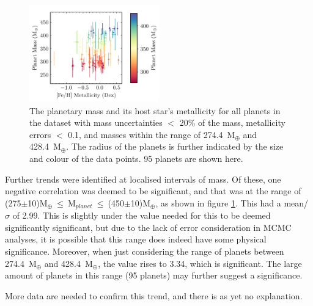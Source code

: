 \documentclass[a4paper,twocolumn,12pt]{article}
\begin{document}
\begin{figure}[h!]
    \centering
    \includegraphics[width=0.5\textwidth]{Graphs/FeH vs Mass Planet Plot 274.4 to 428.4.pdf}
    \caption{The planetary mass and its host star's metallicity for all planets in the dataset with mass uncertainties $<$ 20\% of the mass, metallicity errors $<$ 0.1, and masses within the range of 274.4~M$_{\oplus}$ and 428.4~M$_{\oplus}$. The radius of the planets is further indicated by the size and colour of the data points. 95 planets are shown here.}
    \label{figure: Fe/H vs Mass for the jupiter mass range}
\end{figure}

Further trends were identified at localised intervals of mass. Of these, one negative correlation was deemed to be significant, and that was at the range of (275$\pm$10)M$_{\oplus}~\leq~$M$_{planet}~\leq~$(450$\pm$10)M$_{\oplus}$, as shown in figure \ref{figure: Fe/H vs Mass for the jupiter mass range}. This had a mean/$\sigma$ of 2.99. This is slightly under the value needed for this to be deemed significantly significant, but due to the lack of error consideration in MCMC analyses, it is possible that this range does indeed have some physical significance. Moreover, when just considering the range of planets between 274.4~M$_{\oplus}$ and 428.4~M$_{\oplus}$, the value rises to 3.34, which is significant. The large amount of planets in this range (95 planets) may further suggest a significance.

More data are needed to confirm this trend, and there is as yet no explanation. %



\end{document}
